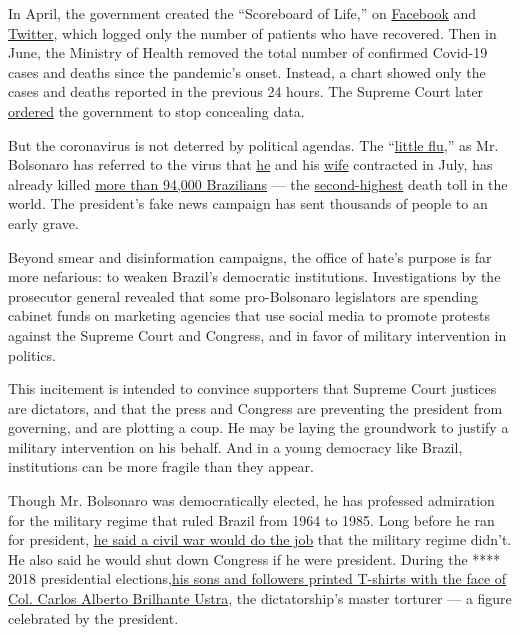 In April, the government created the ``Scoreboard of Life,'' on
\href{https://www.facebook.com/minsaude/posts/3549590468392877}{Facebook}
and
\href{https://twitter.com/secomvc/status/1257836970518200323}{Twitter},
which logged only the number of patients who have recovered. Then in
June, the Ministry of Health removed the total number of confirmed
Covid-19 cases and deaths since the pandemic's onset. Instead, a chart
showed only the cases and deaths reported in the previous 24 hours. The
Supreme Court later
\href{https://www.nytimes.com/2020/06/19/world/coronavirus-live-updates.html}{ordered}
the government to stop concealing data.

But the coronavirus is not deterred by political agendas. The
``\href{https://www.cnn.com/2020/05/23/americas/brazil-coronavirus-hospitals-intl/index.html}{little
flu},'' as Mr. Bolsonaro has referred to the virus that
\href{https://www.reuters.com/article/us-health-coronavirus-brazil-bolsonaro/brazilian-president-bolsonaro-says-he-has-mold-in-lungs-idUSKCN24V3SH}{he}
and his
\href{https://time.com/5874061/bolsonaro-wife-coronavirus/}{wife}
contracted in July, has already killed
\href{https://www.nytimes.com/interactive/2020/world/americas/brazil-coronavirus-cases.html}{more
than 94,000 Brazilians} --- the
\href{https://coronavirus.jhu.edu/map.html}{second-highest} death toll
in the world. The president's fake news campaign has sent thousands of
people to an early grave.

Beyond smear and disinformation campaigns, the office of hate's purpose
is far more nefarious: to weaken Brazil's democratic institutions.
Investigations by the prosecutor general revealed that some
pro-Bolsonaro legislators are spending cabinet funds on marketing
agencies that use social media to promote protests against the Supreme
Court and Congress, and in favor of military intervention in politics.

This incitement is intended to convince supporters that Supreme Court
justices are dictators, and that the press and Congress are preventing
the president from governing, and are plotting a coup. He may be laying
the groundwork to justify a military intervention on his behalf. And in
a young democracy like Brazil, institutions can be more fragile than
they appear.

Though Mr. Bolsonaro was democratically elected, he has professed
admiration for the military regime that ruled Brazil from 1964 to 1985.
Long before he ran for president,
\href{https://www.youtube.com/watch?v=qIDyw9QKIvw\&t=577s}{he said a
civil war would do the job} that the military regime didn't. He also
said he would shut down Congress if he were president. During the ****
2018 presidential
elections,\href{https://congressoemfoco.uol.com.br/especial/noticias/fas-usam-imagem-de-torturador-para-promover-bolsonaro/}{his
sons and followers printed T-shirts with the face of Col. Carlos Alberto
Brilhante Ustra}, the dictatorship's master torturer --- a figure
celebrated by the president.

